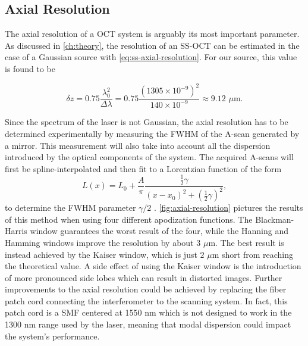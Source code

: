 \subsection{Axial Resolution}
The axial resolution of a OCT system is arguably its most important parameter. As discussed in \autoref{ch:theory}, the resolution of an SS-OCT can be estimated in the case of a Gaussian source with \autoref{eq:ss-axial-resolution}. For our source, this value is found to be

\begin{equation}
	\delta z = 0.75 \frac{\lambda_0^2}{\Delta \lambda} = 0.75 \frac{(1305 \times 10^{-9})^2}{140 \times 10^{-9}} \approx 9.12\,\,\mu\text{m}.
\end{equation}

Since the spectrum of the laser is not Gaussian, the axial resolution has to be determined experimentally by measuring the FWHM of the A-scan generated by a mirror. This measurement will also take into account all the dispersion introduced by the optical components of the system. The acquired A-scans will first be spline-interpolated and then fit to a Lorentzian function of the form
\begin{equation}
	L(x) = L_0 + \frac{A}{\pi}\frac{\frac{1}{2} \gamma }{(x-x_0)^2 + (\frac{1}{2}\gamma)^2},
\end{equation}
to determine the FWHM parameter $\gamma/2$ . \autoref{fig:axial-resolution} pictures the results of this method when using four different apodization functions. The Blackman-Harris window guarantees the worst result of the four, while the Hanning and Hamming windows improve the resolution by about $3$ $\mu$m. The best result is instead achieved by the Kaiser window, which is just $2$ $\mu$m short from reaching the theoretical value. A side effect of using the Kaiser window is the introduction of more pronounced side lobes which can result in distorted images. Further improvements to the axial resolution could be achieved by replacing the fiber patch cord connecting the interferometer to the scanning system. In fact, this patch cord is a \ac{SMF} centered at 1550 nm which is not designed to work in the 1300 nm range used by the laser, meaning that modal dispersion could impact the system's performance. 



